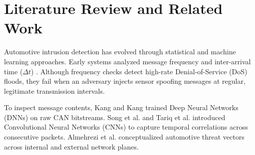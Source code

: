 \documentclass[conference]{IEEEtran}
\begin{document}
\section{Literature Review and Related Work}
Automotive intrusion detection has evolved through statistical and machine learning approaches. Early systems analyzed message frequency and inter-arrival time ($\Delta t$) \cite{taylor2017frequency}. Although frequency checks detect high-rate Denial-of-Service (DoS) floods, they fail when an adversary injects sensor spoofing messages at regular, legitimate transmission intervals.

To inspect message contents, Kang and Kang \cite{kang2016novel} trained Deep Neural Networks (DNNs) on raw CAN bitstreams. Song et al. \cite{song2020invehicle} and Tariq et al. \cite{tariq2021canadf} introduced Convolutional Neural Networks (CNNs) to capture temporal correlations across consecutive packets. Almehrezi et al. \cite{almehrezi2020emerging} conceptualized automotive threat vectors across internal and external network planes.

\begin{table}[t]
\caption{Comparison of ResiliAV With Prior State-of-the-Art Literature}
\label{tab:comparison}
\centering
{}
\end{table}
\end{document}
